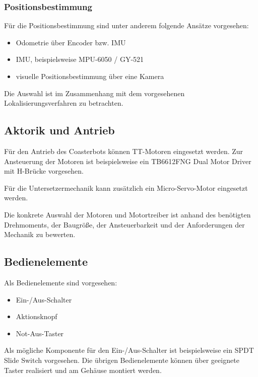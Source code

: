 \subsubsection{Positionsbestimmung}\label{positionsbestimmung}

Für die Positionsbestimmung sind unter anderem folgende Ansätze
vorgesehen:

\begin{itemize}
\tightlist
\item
  Odometrie über Encoder bzw. IMU
\item
  IMU, beispielsweise MPU-6050 / GY-521
\item
  visuelle Positionsbestimmung über eine Kamera
\end{itemize}

Die Auswahl ist im Zusammenhang mit dem vorgesehenen
Lokalisierungsverfahren zu betrachten.

\subsection{Aktorik und Antrieb}\label{aktorik-und-antrieb}

Für den Antrieb des Coasterbots können TT-Motoren eingesetzt werden. Zur
Ansteuerung der Motoren ist beispielsweise ein TB6612FNG Dual Motor
Driver mit H-Brücke vorgesehen.

Für die Untersetzermechanik kann zusätzlich ein Micro-Servo-Motor
eingesetzt werden.

Die konkrete Auswahl der Motoren und Motortreiber ist anhand des
benötigten Drehmoments, der Baugröße, der Ansteuerbarkeit und der
Anforderungen der Mechanik zu bewerten.

\subsection{Bedienelemente}\label{bedienelemente}

Als Bedienelemente sind vorgesehen:

\begin{itemize}
\tightlist
\item
  Ein-/Aus-Schalter
\item
  Aktionsknopf
\item
  Not-Aus-Taster
\end{itemize}

Als mögliche Komponente für den Ein-/Aus-Schalter ist beispielsweise ein
SPDT Slide Switch vorgesehen. Die übrigen Bedienelemente können über
geeignete Taster realisiert und am Gehäuse montiert werden.

